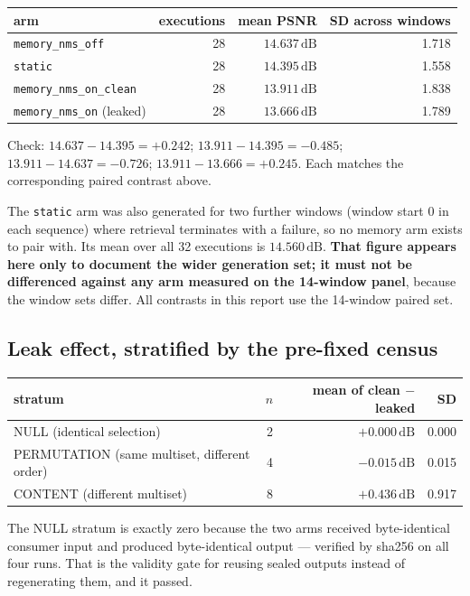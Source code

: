 \documentclass[11pt,a4paper]{article}
\newcommand{\code}[1]{\texttt{\small #1}}
\newcommand{\dB}{\,\mathrm{dB}}
\begin{document}
\begin{center}\small
\begin{tabular}{@{}lrrr@{}}
\toprule
arm & executions & mean PSNR & SD across windows \\
\midrule
\code{memory\_nms\_off}       & 28 & $\mathbf{14.637\dB}$ & 1.718 \\
\code{static}                 & 28 & $\mathbf{14.395\dB}$ & 1.558 \\
\code{memory\_nms\_on\_clean} & 28 & $\mathbf{13.911\dB}$ & 1.838 \\
\code{memory\_nms\_on} (leaked) & 28 & $\mathbf{13.666\dB}$ & 1.789 \\
\bottomrule
\end{tabular}
\end{center}

Check: $14.637-14.395=+0.242$; $13.911-14.395=-0.485$; $13.911-14.637=-0.726$;
$13.911-13.666=+0.245$. Each matches the corresponding paired contrast above.

The \code{static} arm was also generated for two further windows (window start 0 in each sequence)
where retrieval terminates with a failure, so no memory arm exists to pair with. Its mean over all
32 executions is $14.560\dB$. \textbf{That figure appears here only to document the wider generation
set; it must not be differenced against any arm measured on the 14-window panel}, because the window
sets differ. All contrasts in this report use the 14-window paired set.

\subsection{Leak effect, stratified by the pre-fixed census}

\begin{center}\small
\begin{tabular}{@{}lrrr@{}}
\toprule
stratum & $n$ & mean of clean $-$ leaked & SD \\
\midrule
NULL (identical selection) & 2 & $\mathbf{+0.000\dB}$ & 0.000 \\
PERMUTATION (same multiset, different order) & 4 & $\mathbf{-0.015\dB}$ & 0.015 \\
CONTENT (different multiset) & 8 & $+0.436\dB$ & 0.917 \\
\bottomrule
\end{tabular}
\end{center}

The NULL stratum is exactly zero because the two arms received byte-identical consumer input and
produced byte-identical output --- verified by sha256 on all four runs. That is the validity gate for
reusing sealed outputs instead of regenerating them, and it passed.
\end{document}
